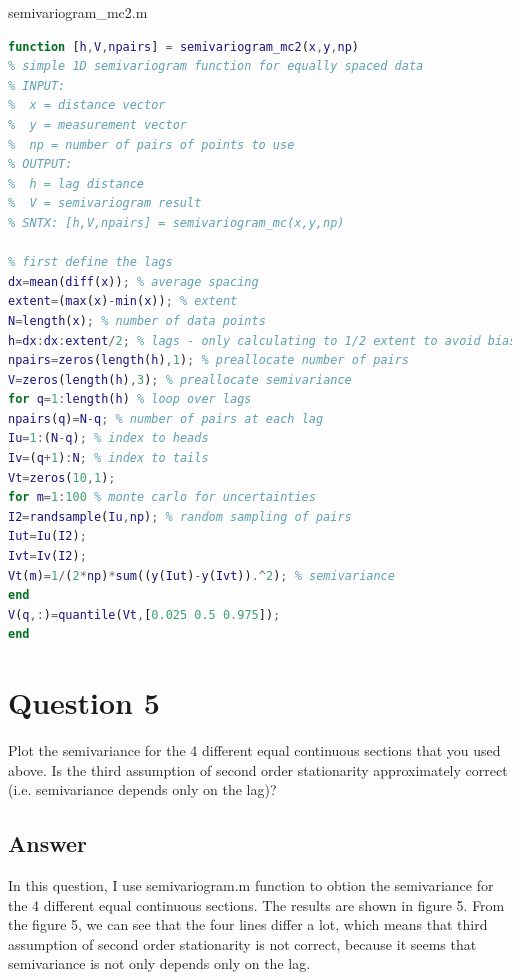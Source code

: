 \documentclass[
	12pt, %
]{fphw}
\begin{document}
semivariogram\_mc2.m
\begin{lstlisting}[language=Matlab,escapeinside=``]
function [h,V,npairs] = semivariogram_mc2(x,y,np)
% simple 1D semivariogram function for equally spaced data
% INPUT:  
%  x = distance vector
%  y = measurement vector
%  np = number of pairs of points to use 
% OUTPUT:
%  h = lag distance
%  V = semivariogram result
% SNTX: [h,V,npairs] = semivariogram_mc(x,y,np)

% first define the lags
dx=mean(diff(x)); % average spacing
extent=(max(x)-min(x)); % extent
N=length(x); % number of data points
h=dx:dx:extent/2; % lags - only calculating to 1/2 extent to avoid bias
npairs=zeros(length(h),1); % preallocate number of pairs
V=zeros(length(h),3); % preallocate semivariance
for q=1:length(h) % loop over lags
npairs(q)=N-q; % number of pairs at each lag
Iu=1:(N-q); % index to heads
Iv=(q+1):N; % index to tails
Vt=zeros(10,1);
for m=1:100 % monte carlo for uncertainties
I2=randsample(Iu,np); % random sampling of pairs
Iut=Iu(I2);
Ivt=Iv(I2);
Vt(m)=1/(2*np)*sum((y(Iut)-y(Ivt)).^2); % semivariance
end
V(q,:)=quantile(Vt,[0.025 0.5 0.975]);
end 
\end{lstlisting}


\clearpage
\section*{Question 5 }

\begin{problem}
Plot the semivariance for the 4 different equal continuous sections that you used above. Is
the third assumption of second order stationarity approximately correct (i.e. semivariance
depends only on the lag)?
\end{problem}


\subsection*{Answer}

In this question, I use semivariogram.m function to obtion the semivariance for the 4 different equal continuous sections. The results are shown in figure 5. From the figure 5, we can see that the four lines differ a lot, which means that third assumption of second order stationarity is not correct, because it seems that semivariance is not only
depends only on the lag. 
\end{document}
